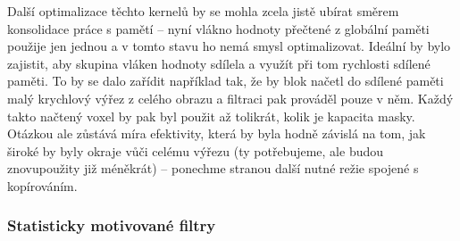     Další optimalizace těchto kernelů by se mohla zcela jistě ubírat směrem konsolidace práce s pamětí -- nyní vlákno hodnoty přečtené z globální paměti použije jen jednou a v tomto stavu ho nemá smysl optimalizovat. Ideální by bylo zajistit, aby skupina vláken hodnoty sdílela a využít při tom rychlosti sdílené paměti. To by se dalo zařídit například tak, že by blok načetl do sdílené paměti malý krychlový výřez z celého obrazu a filtraci pak prováděl pouze v něm. Každý takto načtený voxel by pak byl použit až tolikrát, kolik je kapacita masky. Otázkou ale zůstává míra efektivity, která by byla hodně závislá na tom, jak široké by byly okraje vůči celému výřezu (ty potřebujeme, ale budou znovupoužity již méněkrát) -- ponechme stranou další nutné režie spojené s kopírováním.

    \subsubsection{Statisticky motivované filtry}

